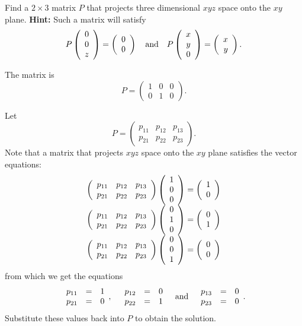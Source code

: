 \documentclass{article}
\begin{document}



\problemlabel

\begin{exercise} \label{c4.2.3}
Find a $2\times 3$ matrix $P$ that projects three dimensional $xyz$ space onto
the $xy$ plane.  {\bf Hint:} Such a matrix will satisfy
\[
P\left(\begin{array}{c} 0 \\ 0 \\ z \end{array}\right) = \left(\begin{array}{r} 0 \\ 0\end{array}\right)
\quad\mbox{and}\quad
P\left(\begin{array}{c} x \\ y \\ 0 \end{array}\right) = \left(\begin{array}{r} x \\ y\end{array}\right).
\]

\begin{solution}

\ans The matrix is
\[ P = \left(\begin{array}{rrr} 1 & 0 & 0 \\ 0 & 1 & 0\end{array}\right). \]

\soln Let
\[ P = \left(\begin{array}{rrr} p_{11} & p_{12} & p_{13} \\
p_{21} & p_{22} & p_{23}\end{array}\right). \]
Note that a matrix that projects $xyz$ space onto the $xy$ plane
satisfies the vector equations:
\[ \begin{array}{c} \left(\begin{array}{rrr} p_{11} & p_{12} &
p_{13} \\ p_{21} & p_{22} & p_{23} \end{array}\right)
\left(\begin{array}{r} 1 \\ 0 \\ 0\end{array}\right) = \left(\begin{array}{r} 1 \\ 0\end{array}\right) \\
\left(\begin{array}{rrr} p_{11} & p_{12} & p_{13} \\ p_{21} &
p_{22} & p_{23} \end{array}\right) \left(\begin{array}{r} 0 \\ 1 \\ 0\end{array}\right) = \left(\begin{array}{r} 0 \\ 1\end{array}\right) \\
\left(\begin{array}{rrr} p_{11} & p_{12} & p_{13} \\ p_{21} & p_{22}
& p_{23} \end{array}\right) \left(\begin{array}{r} 0 \\ 0 \\ 1\end{array}\right) = \left(\begin{array}{r} 0 \\ 0\end{array}\right) \end{array} 
\]
from which we get the equations
\[ \begin{array}{rrrrrrr}
p_{11} & = & 1 \\
p_{21} & = & 0 \end{array},
\quad
\begin{array}{rrrrrrr}
p_{12} & = & 0 \\
p_{22} & = & 1 \end{array}
\quad\mbox{and}\quad
\begin{array}{rrrrrrr}
p_{13} & = & 0 \\
p_{23} & = & 0 \end{array}. 
\]
Substitute these values back into $P$ to obtain the solution.


\end{solution}
\end{exercise}
\end{document}

